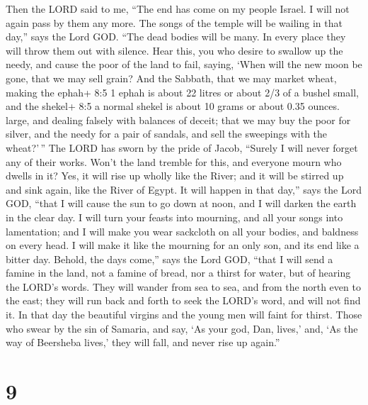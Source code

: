 Then the LORD said to me, ``The end has come on my people Israel. I will
not again pass by them any more.  The songs of the temple
will be wailing in that day,'' says the Lord GOD. ``The dead bodies will
be many. In every place they will throw them out with silence.
 Hear this, you who desire to swallow up the needy, and
cause the poor of the land to fail,  saying, `When will the
new moon be gone, that we may sell grain? And the Sabbath, that we may
market wheat, making the ephah+ 8:5 1 ephah is about 22 litres or about
2/3 of a bushel small, and the shekel+ 8:5 a normal shekel is about 10
grams or about 0.35 ounces. large, and dealing falsely with balances of
deceit;  that we may buy the poor for silver, and the needy
for a pair of sandals, and sell the sweepings with the wheat?'\,''
 The LORD has sworn by the pride of Jacob, ``Surely I will
never forget any of their works.  Won't the land tremble for
this, and everyone mourn who dwells in it? Yes, it will rise up wholly
like the River; and it will be stirred up and sink again, like the River
of Egypt.  It will happen in that day,'' says the Lord GOD,
``that I will cause the sun to go down at noon, and I will darken the
earth in the clear day.  I will turn your feasts into
mourning, and all your songs into lamentation; and I will make you wear
sackcloth on all your bodies, and baldness on every head. I will make it
like the mourning for an only son, and its end like a bitter day.
 Behold, the days come,'' says the Lord GOD, ``that I will
send a famine in the land, not a famine of bread, nor a thirst for
water, but of hearing the LORD's words.  They will wander
from sea to sea, and from the north even to the east; they will run back
and forth to seek the LORD's word, and will not find it. 
In that day the beautiful virgins and the young men will faint for
thirst.  Those who swear by the sin of Samaria, and say,
`As your god, Dan, lives,' and, `As the way of Beersheba lives,' they
will fall, and never rise up again.''

\hypertarget{section-8}{%
\section{9}\label{section-8}}

